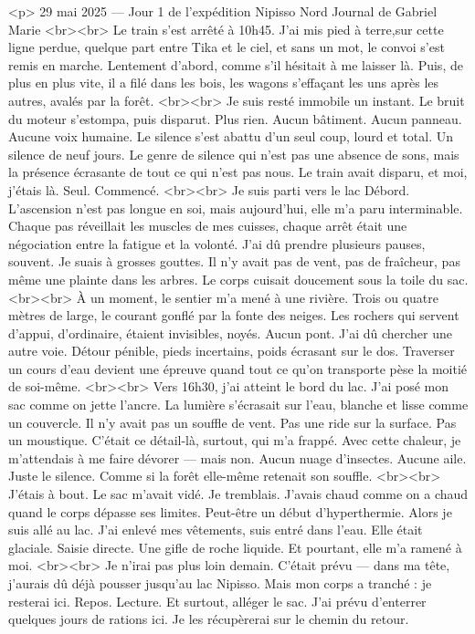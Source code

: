 
<p>
29 mai 2025 — Jour 1 de l’expédition Nipisso Nord
Journal de Gabriel Marie
<br><br>
Le train s’est arrêté à 10h45. J’ai mis pied à terre,sur cette ligne perdue, quelque part entre Tika et le ciel, et sans un mot, le convoi s’est remis en marche. Lentement d’abord, comme s’il hésitait à me laisser là. Puis, de plus en plus vite, il a filé dans les bois, les wagons s’effaçant les uns après les autres, avalés par la forêt.
<br><br>
Je suis resté immobile un instant. Le bruit du moteur s’estompa, puis disparut. Plus rien. Aucun bâtiment. Aucun panneau. Aucune voix humaine. Le silence s’est abattu d’un seul coup, lourd et total. Un silence de neuf jours. Le genre de silence qui n’est pas une absence de sons, mais la présence écrasante de tout ce qui n’est pas nous. Le train avait disparu, et moi, j’étais là. Seul. Commencé.
<br><br>
Je suis parti vers le lac Débord. L’ascension n’est pas longue en soi, mais aujourd’hui, elle m’a paru interminable. Chaque pas réveillait les muscles de mes cuisses, chaque arrêt était une négociation entre la fatigue et la volonté. J’ai dû prendre plusieurs pauses, souvent. Je suais à grosses gouttes. Il n’y avait pas de vent, pas de fraîcheur, pas même une plainte dans les arbres. Le corps cuisait doucement sous la toile du sac.
<br><br>
À un moment, le sentier m’a mené à une rivière. Trois ou quatre mètres de large, le courant gonflé par la fonte des neiges. Les rochers qui servent d’appui, d’ordinaire, étaient invisibles, noyés. Aucun pont. J’ai dû chercher une autre voie. Détour pénible, pieds incertains, poids écrasant sur le dos. Traverser un cours d’eau devient une épreuve quand tout ce qu’on transporte pèse la moitié de soi-même.
<br><br>
Vers 16h30, j’ai atteint le bord du lac. J’ai posé mon sac comme on jette l’ancre. La lumière s’écrasait sur l’eau, blanche et lisse comme un couvercle. Il n’y avait pas un souffle de vent. Pas une ride sur la surface. Pas un moustique. C’était ce détail-là, surtout, qui m’a frappé. Avec cette chaleur, je m’attendais à me faire dévorer — mais non. Aucun nuage d’insectes. Aucune aile. Juste le silence. Comme si la forêt elle-même retenait son souffle.
<br><br>
J’étais à bout. Le sac m’avait vidé. Je tremblais. J’avais chaud comme on a chaud quand le corps dépasse ses limites. Peut-être un début d’hyperthermie. Alors je suis allé au lac. J’ai enlevé mes vêtements, suis entré dans l’eau. Elle était glaciale. Saisie directe. Une gifle de roche liquide. Et pourtant, elle m’a ramené à moi.
<br><br>
Je n’irai pas plus loin demain. C’était prévu — dans ma tête, j’aurais dû déjà pousser jusqu’au lac Nipisso. Mais mon corps a tranché : je resterai ici. Repos. Lecture. Et surtout, alléger le sac. J’ai prévu d’enterrer quelques jours de rations ici. Je les récupèrerai sur le chemin du retour.
